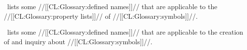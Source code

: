 

\Thenextfigure\ lists some //[[CL:Glossary:defined names]]// that are applicable to the //[[CL:Glossary:property lists]]// of //[[CL:Glossary:symbols]]//.

                     \Thenextfigure\ lists some //[[CL:Glossary:defined names]]// that are applicable  to the creation of and inquiry about //[[CL:Glossary:symbols]]//.


